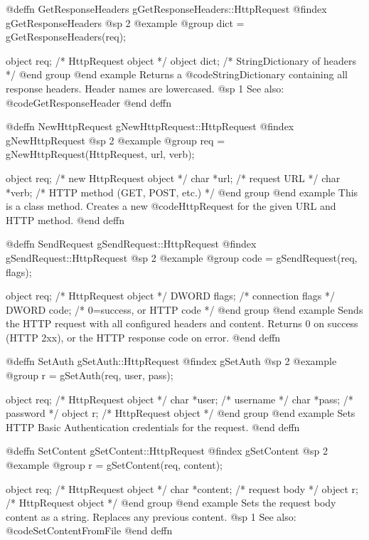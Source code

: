 @deffn {GetResponseHeaders} gGetResponseHeaders::HttpRequest
@findex gGetResponseHeaders
@sp 2
@example
@group
dict = gGetResponseHeaders(req);

object  req;    /*  HttpRequest object          */
object  dict;   /*  StringDictionary of headers */
@end group
@end example
Returns a @code{StringDictionary} containing all response headers.
Header names are lowercased.
@sp 1
See also:  @code{GetResponseHeader}
@end deffn



@deffn {NewHttpRequest} gNewHttpRequest::HttpRequest
@findex gNewHttpRequest
@sp 2
@example
@group
req = gNewHttpRequest(HttpRequest, url, verb);

object  req;    /*  new HttpRequest object  */
char    *url;   /*  request URL             */
char    *verb;  /*  HTTP method (GET, POST, etc.)  */
@end group
@end example
This is a class method.  Creates a new @code{HttpRequest} for the given
URL and HTTP method.
@end deffn



@deffn {SendRequest} gSendRequest::HttpRequest
@findex gSendRequest::HttpRequest
@sp 2
@example
@group
code = gSendRequest(req, flags);

object  req;    /*  HttpRequest object        */
DWORD   flags;  /*  connection flags          */
DWORD   code;   /*  0=success, or HTTP code   */
@end group
@end example
Sends the HTTP request with all configured headers and content.
Returns 0 on success (HTTP 2xx), or the HTTP response code on error.
@end deffn



@deffn {SetAuth} gSetAuth::HttpRequest
@findex gSetAuth
@sp 2
@example
@group
r = gSetAuth(req, user, pass);

object  req;    /*  HttpRequest object  */
char    *user;  /*  username            */
char    *pass;  /*  password            */
object  r;      /*  HttpRequest object  */
@end group
@end example
Sets HTTP Basic Authentication credentials for the request.
@end deffn



@deffn {SetContent} gSetContent::HttpRequest
@findex gSetContent
@sp 2
@example
@group
r = gSetContent(req, content);

object  req;      /*  HttpRequest object  */
char    *content; /*  request body        */
object  r;        /*  HttpRequest object  */
@end group
@end example
Sets the request body content as a string.  Replaces any previous
content.
@sp 1
See also:  @code{SetContentFromFile}
@end deffn



